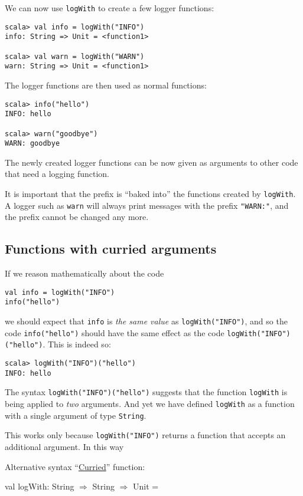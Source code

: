 We can now use \lstinline!logWith! to create a few logger functions:
\begin{lstlisting}
scala> val info = logWith("INFO")
info: String => Unit = <function1>

scala> val warn = logWith("WARN")
warn: String => Unit = <function1>
\end{lstlisting}
The logger functions are then used as normal functions:
\begin{lstlisting}
scala> info("hello")
INFO: hello

scala> warn("goodbye")
WARN: goodbye
\end{lstlisting}
The newly created logger functions can be now given as arguments to
other code that need a logging function.

It is important that the prefix is ``baked into'' the functions
created by \lstinline!logWith!. A logger such as \lstinline!warn!
will always print messages with the prefix \lstinline!"WARN:"!, and
the prefix cannot be changed any more.

\subsection{Functions with curried arguments}

If we reason mathematically about the code
\begin{lstlisting}
val info = logWith("INFO")
info("hello")
\end{lstlisting}
we should expect that \lstinline!info! is \emph{the same value} as
\lstinline!logWith("INFO")!, and so the code \lstinline!info("hello")!
should have the same effect as the code \lstinline!logWith("INFO")("hello")!.
This is indeed so:
\begin{lstlisting}
scala> logWith("INFO")("hello")
INFO: hello
\end{lstlisting}
The syntax \lstinline!logWith("INFO")("hello")! suggests that the
function \lstinline!logWith! is being applied to \emph{two} arguments.
And yet we have defined \lstinline!logWith! as a function with a
single argument of type \lstinline!String!. 

This works only because \lstinline!logWith("INFO")! returns a function
that accepts an additional argument. In this way

Alternative syntax \textendash{} ``\href{https://en.wikipedia.org/wiki/Currying}{Curried}''
function:

val logWith: String $\Rightarrow$ String $\Rightarrow$ Unit = 

